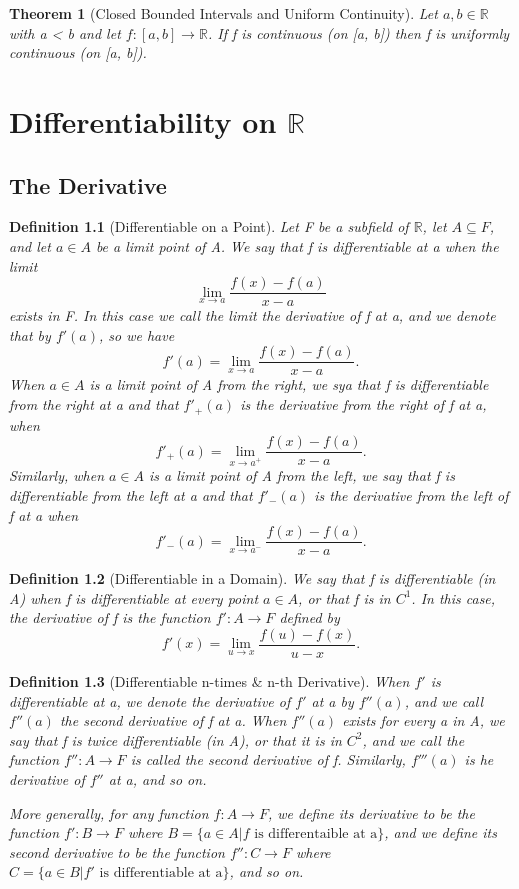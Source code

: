 \documentclass[11pt, oneside]{book}
\theoremstyle{break}
\newtheorem{thm}{Theorem}[section]
\newtheorem{defn}{Definition}[section]
\newcommand{\bb}[1]{\mathbb{#1}}		%
\begin{document}
\begin{thm}[Closed Bounded Intervals and Uniform Continuity]
	Let $a, b \in \bb{R}$ with a < b and let $f: [a, b] \to \bb{R}$. If f is continuous (on [a, b]) then f is uniformly continuous (on [a, b]).
\end{thm}

\chapter{Differentiability on \texorpdfstring{$\bb{R}$}{R}}


\section{The Derivative}

\begin{defn}[Differentiable on a Point]
	Let F be a subfield of $\bb{R}$, let $A \subseteq F$, and let $a \in A$ be a limit point of A. We say that f is differentiable at a when the limit
	\[
		\lim_{x \to a} \frac{f(x) - f(a)}{x - a}
	\]
	exists in F. In this case we call the limit the derivative of f at a, and we denote that by $f'(a)$, so we have
	\[
		f'(a) = \lim_{x \to a} \frac{f(x) - f(a)}{x - a}.
	\]
	When $a \in A$ is a limit point of A from the right, we sya that f is differentiable from the right at a and that $f'_+(a)$ is the derivative from the right of f at a, when
	\[
		f'_+(a) = \lim_{x \to a^+} \frac{f(x) - f(a)}{x - a}.
	\]
	Similarly, when $a \in A$ is a limit point of A from the left, we say that f is differentiable from the left at a and that $f'_{-}(a)$ is the derivative from the left of f at a when
	\[
		f'_{-}(a) = \lim_{x \to a^-} \frac{f(x) - f(a)}{x - a}.
	\]
\end{defn}

\begin{defn}[Differentiable in a Domain]
	We say that f is differentiable (in A) when f is differentiable at every point $a \in A$, or that f is in $C^1$. In this case, the derivative of f is the function $f': A \to F$ defined by
	\[
		f'(x) = \lim_{u \to x} \frac{f(u) - f(x)}{u - x}.
	\]
\end{defn}

\begin{defn}[Differentiable n-times \& n-th Derivative]
	When $f'$ is differentiable at a, we denote the derivative of $f'$ at a by $f''(a)$, and we call $f''(a)$ the second derivative of f at a. When $f''(a)$ exists for every a in A, we say that f is twice differentiable (in A), or that it is in $C^2$, and we call the function $f'': A \to F$ is called the second derivative of f. Similarly, $f'''(a)$ is he derivative of $f''$ at a, and so on.

	More generally, for any function $f: A \to F$, we define its derivative to be the function $f': B \to F$ where $B = \{a \in A | f \text{ is differentaible at a}\}$, and we define its second derivative to be the function $f'': C \to F$ where $C = \{a \in B | f' \text{ is differentiable at a}\}$, and so on.
\end{defn}
\end{document}
